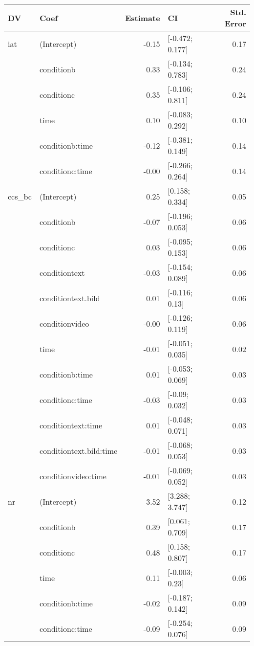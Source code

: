 \begin{table}[ht]
\centering
\begin{tabular}{llrlr}
  \hline
DV & Coef & Estimate & CI & Std. Error \\ 
  \hline
iat & (Intercept) & -0.15 & [-0.472; 0.177] & 0.17 \\ 
   & conditionb & 0.33 & [-0.134; 0.783] & 0.24 \\ 
   & conditionc & 0.35 & [-0.106; 0.811] & 0.24 \\ 
   & time & 0.10 & [-0.083; 0.292] & 0.10 \\ 
   & conditionb:time & -0.12 & [-0.381; 0.149] & 0.14 \\ 
   & conditionc:time & -0.00 & [-0.266; 0.264] & 0.14 \\ 
   \hline
ccs\_bc & (Intercept) & 0.25 & [0.158; 0.334] & 0.05 \\ 
   & conditionb & -0.07 & [-0.196; 0.053] & 0.06 \\ 
   & conditionc & 0.03 & [-0.095; 0.153] & 0.06 \\ 
   & conditiontext & -0.03 & [-0.154; 0.089] & 0.06 \\ 
   & conditiontext.bild & 0.01 & [-0.116; 0.13] & 0.06 \\ 
   & conditionvideo & -0.00 & [-0.126; 0.119] & 0.06 \\ 
   & time & -0.01 & [-0.051; 0.035] & 0.02 \\ 
   & conditionb:time & 0.01 & [-0.053; 0.069] & 0.03 \\ 
   & conditionc:time & -0.03 & [-0.09; 0.032] & 0.03 \\ 
   & conditiontext:time & 0.01 & [-0.048; 0.071] & 0.03 \\ 
   & conditiontext.bild:time & -0.01 & [-0.068; 0.053] & 0.03 \\ 
   & conditionvideo:time & -0.01 & [-0.069; 0.052] & 0.03 \\ 
   \hline
nr & (Intercept) & 3.52 & [3.288; 3.747] & 0.12 \\ 
   & conditionb & 0.39 & [0.061; 0.709] & 0.17 \\ 
   & conditionc & 0.48 & [0.158; 0.807] & 0.17 \\ 
   & time & 0.11 & [-0.003; 0.23] & 0.06 \\ 
   & conditionb:time & -0.02 & [-0.187; 0.142] & 0.09 \\ 
   & conditionc:time & -0.09 & [-0.254; 0.076] & 0.09 \\ 

\end{tabular}
\end{table}
